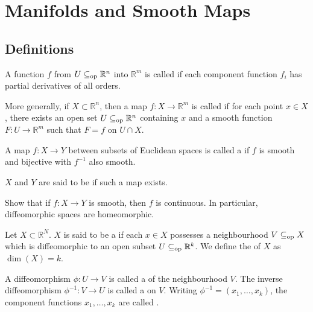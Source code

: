 \section{Manifolds and Smooth Maps}
\subsection{Definitions}

\begin{defn}
	A function $f$ from $U \subseteq_{\operatorname{op}} \mathbb{R}^{n}$ into $\mathbb{R}^{m}$ is called  if each component function $f_{i}$ has partial derivatives of all orders.

	More generally, if $X \subset \mathbb{R}^{n}$, then a map $f : X \to \mathbb{R}^{m}$ is called  if for each point $x \in X$, there exists an open set $U \subseteq_{\operatorname{op}} \mathbb{R}^{n}$ containing $x$ and a smooth function $F : U \to \mathbb{R}^{m}$ such that $F = f$ on $U \cap X$.
\end{defn}

\begin{defn}
	A map $f : X \to Y$ between subsets of Euclidean spaces is called a  if $f$ is smooth and bijective with $f^{-1}$ also smooth.

	$X$ and $Y$ are said to be  if such a map exists.
\end{defn}

\begin{exe}
	Show that if $f : X \to Y$ is smooth, then $f$ is continuous. \newline
	In particular, diffeomorphic spaces are homeomorphic.
\end{exe}

\begin{defn}
	Let $X \subset \mathbb{R}^{N}$. $X$ is said to be a  if each $x \in X$ possesses a neighbourhood $V \subseteq_{\operatorname{op}} X$ which is diffeomorphic to an open subset $U \subseteq_{\operatorname{op}} \mathbb{R}^{k}$. We define the  of $X$ as $\dim(X) = k$.

	A diffeomorphism $\phi : U \to V$ is called a  of the neighbourhood $V$. The inverse diffeomorphism $\phi^{-1} : V \to U$ is called a  on $V$. \newline
	Writing $\phi^{-1} = (x_{1}, \ldots, x_{k})$, the component functions $x_{1}, \ldots, x_{k}$ are called .
\end{defn}


